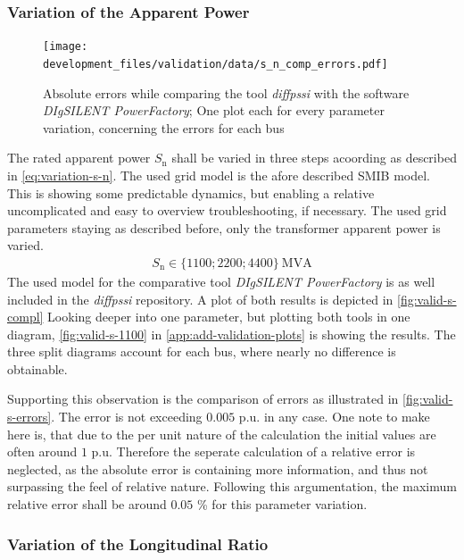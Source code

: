 \subsubsection{Variation of the Apparent Power}

\begin{figure}[htbp!]
    \centering
    \texttt{[image: development\_files/validation/data/s\_n\_comp\_errors.pdf]}
    \caption[Model error comparison concerning the variation of the rated apparent power]{Absolute errors while comparing the tool \textit{diffpssi} with the software \textit{DIgSILENT PowerFactory}; One plot each for every parameter variation, concerning the errors for each bus}
    \label{fig:valid-s-errors}
\end{figure}

The rated apparent power $S_\mathrm{n}$ shall be varied in three steps acoording as described in \autoref{eq:variation-s-n}. 
The used grid model is the afore described \acs{SMIB} model. 
This is showing some predictable dynamics, but enabling a relative uncomplicated and easy to overview troubleshooting, if necessary.
The used grid parameters staying as described before, only the transformer apparent power is varied.
\begin{align}
    S_\mathrm{n} \in \{ 1100; 2200; 4400 \}~\mathrm{MVA} \label{eq:variation-s-n}
\end{align}
The used model for the comparative tool \textit{DIgSILENT PowerFactory} is as well included in the \textit{diffpssi} repository.
A plot of both results is depicted in \autoref{fig:valid-s-compl}
Looking deeper into one parameter, but plotting both tools in one diagram, \autoref{fig:valid-s-1100} in \autoref{app:add-validation-plots} is showing the results.
The three split diagrams account for each bus, where nearly no difference is obtainable.

Supporting this observation is the comparison of errors as illustrated in \autoref{fig:valid-s-errors}.
The error is not exceeding $0.005$ p.u. in any case.
One note to make here is, that due to the per unit nature of the calculation the initial values are often around $1$ p.u.
Therefore the seperate calculation of a relative error is neglected, as the absolute error is containing more information, and thus not surpassing the feel of relative nature.
Following this argumentation, the maximum relative error shall be around $0.05$ \% for this parameter variation.

\subsubsection{Variation of the Longitudinal Ratio}

